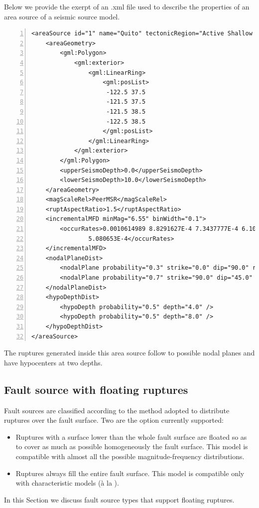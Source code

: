 Below we provide the exerpt of an .xml file used to describe the properties of
an area source of a seismic source model.
\begin{Verbatim}[frame=single, commandchars=\\\{\}, fontsize=\footnotesize,
numbers=left, numbersep=2pt]
<areaSource id="1" name="Quito" tectonicRegion="Active Shallow Crust">
    <areaGeometry>
        <gml:Polygon>
            <gml:exterior>
                <gml:LinearRing>
                    <gml:posList>
                     -122.5 37.5
                     -121.5 37.5
                     -121.5 38.5
                     -122.5 38.5
                    </gml:posList>
                </gml:LinearRing>
            </gml:exterior>
        </gml:Polygon>
        <upperSeismoDepth>0.0</upperSeismoDepth>
        <lowerSeismoDepth>10.0</lowerSeismoDepth>
    </areaGeometry>
    <magScaleRel>PeerMSR</magScaleRel>
    <ruptAspectRatio>1.5</ruptAspectRatio>
    <incrementalMFD minMag="6.55" binWidth="0.1">
        <occurRates>0.0010614989 8.8291627E-4 7.3437777E-4 6.108288E-4 
				5.080653E-4</occurRates>
    </incrementalMFD>
    <nodalPlaneDist>
        <nodalPlane probability="0.3" strike="0.0" dip="90.0" rake="0.0"/>
        <nodalPlane probability="0.7" strike="90.0" dip="45.0" rake="90.0"/>
    </nodalPlaneDist>
    <hypoDepthDist>
        <hypoDepth probability="0.5" depth="4.0" />
        <hypoDepth probability="0.5" depth="8.0" />
    </hypoDepthDist>
</areaSource>
\end{Verbatim}
The ruptures generated inside this area source follow to possible nodal 
planes and have hypocenters at two depths. 
%
\subsection{Fault source with floating ruptures}
%
Fault sources are classified according to the method adopted to 
distribute ruptures over the fault surface. Two are the option currently 
supported: 
\begin{itemize}
    \item Ruptures with a surface lower than the whole fault surface are 
        floated so as to cover as much as possible homogeneously the fault
        surface.
        This model is compatible with almost all the possible 
        magnitude-frequency distributions.
    \item Ruptures always fill the entire fault surface. This model is 
        compatible only with characteristic models (\`{a} la 
        \cite{schwartz1984}).
\end{itemize}
In this Section we discuss fault source types that support floating ruptures.
%
